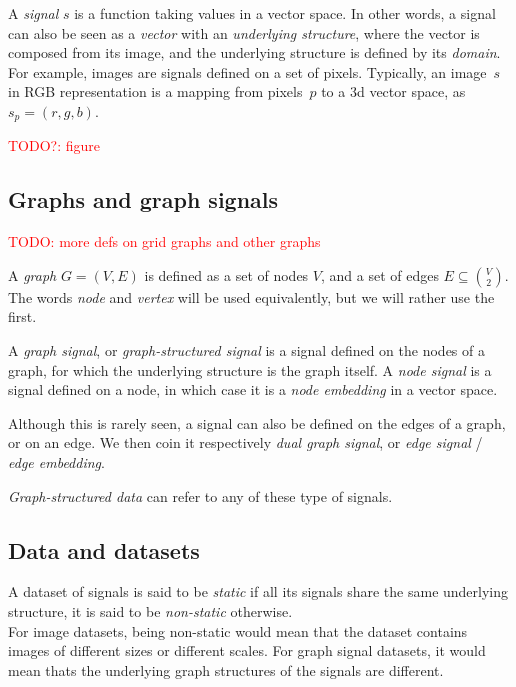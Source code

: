A \emph{signal} $s$ is a function taking values in a vector space. In other words, a signal can also be seen as a \emph{vector} with an \emph{underlying structure}, where the vector is composed from its image, and the underlying structure is defined by its \emph{domain}.\\

For example, images are signals defined on a set of pixels. Typically, an image~$s$ in RGB representation is a mapping from pixels~$p$ to a 3d vector space, as $s_p = (r,g,b)$.

\textcolor{red}{TODO?: figure}
\begin{figure}

\end{figure}

\subsection{Graphs and graph signals}

%
\textcolor{red}{TODO: more defs on grid graphs and other graphs}
%

A \emph{graph} $G = (V, E)$ is defined as a set of nodes $V$, and a set of edges $E \subseteq\binom{V}{2}$. The words \emph{node} and \emph{vertex} will be used equivalently, but we will rather use the first.

A \emph{graph signal}, or \emph{graph-structured signal} is a signal defined on the nodes of a graph, for which the underlying structure is the graph itself.
A \emph{node signal} is a signal defined on a node, in which case it is a \emph{node embedding} in a vector space.

Although this is rarely seen, a signal can also be defined on the edges of a graph, or on an edge. We then coin it respectively \emph{dual graph signal}, or \emph{edge signal} / \emph{edge embedding}.

\emph{Graph-structured data} can refer to any of these type of signals.

\subsection{Data and datasets}

A dataset of signals is said to be \emph{static} if all its signals share the same underlying structure, it is said to be \emph{non-static} otherwise.\\
For image datasets, being non-static would mean that the dataset contains images of different sizes or different scales. For graph signal datasets, it would mean thats the underlying graph structures of the signals are different.

